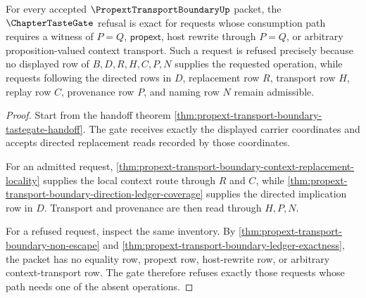 \begin{theorem}
\label{thm:propext-transport-boundary-tastegate-refusal-exactness}
For every accepted $\PropextTransportBoundaryUp$ packet, the $\ChapterTasteGate$ refusal is exact for requests whose consumption path requires a witness of $P=Q$, $\mathsf{propext}$, host rewrite through $P=Q$, or arbitrary proposition-valued context transport. Such a request is refused precisely because no displayed row of $B,D,R,H,C,P,N$ supplies the requested operation, while requests following the directed rows in $D$, replacement row $R$, transport row $H$, replay row $C$, provenance row $P$, and naming row $N$ remain admissible.
\end{theorem}
\begin{proof}
Start from the handoff theorem \autoref{thm:propext-transport-boundary-tastegate-handoff}. The gate receives exactly the displayed carrier coordinates and accepts directed replacement reads recorded by those coordinates.

For an admitted request, \autoref{thm:propext-transport-boundary-context-replacement-locality} supplies the local context route through $R$ and $C$, while \autoref{thm:propext-transport-boundary-direction-ledger-coverage} supplies the directed implication row in $D$. Transport and provenance are then read through $H,P,N$.

For a refused request, inspect the same inventory. By \autoref{thm:propext-transport-boundary-non-escape} and \autoref{thm:propext-transport-boundary-ledger-exactness}, the packet has no equality row, propext row, host-rewrite row, or arbitrary context-transport row. The gate therefore refuses exactly those requests whose path needs one of the absent operations.
\end{proof}

